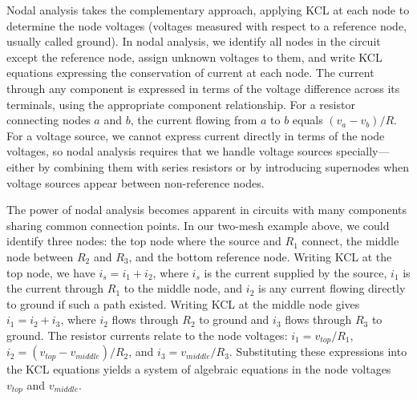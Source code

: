 Nodal analysis takes the complementary approach, applying KCL at each node to determine the node voltages (voltages measured with respect to a reference node, usually called ground). In nodal analysis, we identify all nodes in the circuit except the reference node, assign unknown voltages to them, and write KCL equations expressing the conservation of current at each node. The current through any component is expressed in terms of the voltage difference across its terminals, using the appropriate component relationship. For a resistor connecting nodes $a$ and $b$, the current flowing from $a$ to $b$ equals $(v_a - v_b)/R$. For a voltage source, we cannot express current directly in terms of the node voltages, so nodal analysis requires that we handle voltage sources specially—either by combining them with series resistors or by introducing supernodes when voltage sources appear between non-reference nodes.

The power of nodal analysis becomes apparent in circuits with many components sharing common connection points. In our two-mesh example above, we could identify three nodes: the top node where the source and $R_1$ connect, the middle node between $R_2$ and $R_3$, and the bottom reference node. Writing KCL at the top node, we have $i_s = i_1 + i_2$, where $i_s$ is the current supplied by the source, $i_1$ is the current through $R_1$ to the middle node, and $i_2$ is any current flowing directly to ground if such a path existed. Writing KCL at the middle node gives $i_1 = i_2 + i_3$, where $i_2$ flows through $R_2$ to ground and $i_3$ flows through $R_3$ to ground. The resistor currents relate to the node voltages: $i_1 = v_{top}/R_1$, $i_2 = (v_{top} - v_{middle})/R_2$, and $i_3 = v_{middle}/R_3$. Substituting these expressions into the KCL equations yields a system of algebraic equations in the node voltages $v_{top}$ and $v_{middle}$.

